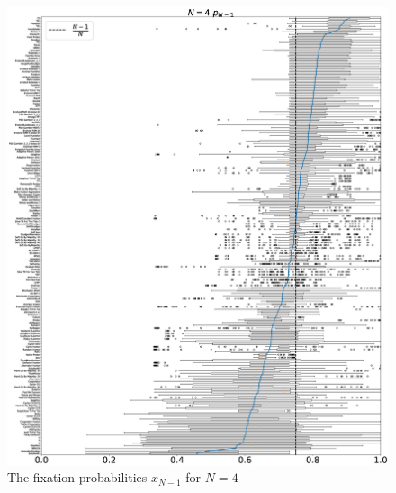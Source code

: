 \documentclass[10pt,letterpaper]{article}
\begin{document}
\begin{figure}[!hbtp]
    \centering
    \includegraphics[draft, width=\textwidth]{./Fig26.eps}
    \caption{The fixation probabilities \(x_{N-1}\) for \(N=4\)}
\end{figure}
\end{document}
